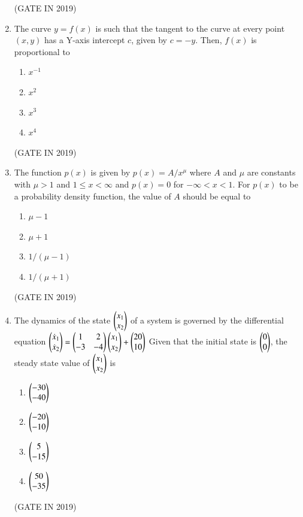 \documentclass[journal]{IEEEtran}
\begin{document}
\begin{enumerate}
\hfill(GATE IN 2019)
\item The curve $y=f(x)$ is such that the tangent to the curve at every point $(x,y)$ has a Y-axis intercept $c$, given by $c=-y$. Then, $f(x)$ is proportional to
\begin{multicols}{4}
\begin{enumerate}
\item $x^{-1}$
\item $x^2$
\item $x^3$
\item $x^4$
\end{enumerate}
\end{multicols} \hfill(GATE IN 2019)

\item The function $p(x)$ is given by $p(x)=A/x^\mu$ where $A$ and $\mu$ are constants with $\mu>1$ and $1\leq x<\infty$ and $p(x)=0$ for $-\infty<x<1$. For $p(x)$ to be a probability density function, the value of $A$ should be equal to
\begin{multicols}{2}
\begin{enumerate}
\item $\mu-1$
\item $\mu+1$
\item $1/(\mu-1)$
\item $1/(\mu+1)$
\end{enumerate}
\end{multicols} \hfill(GATE IN 2019)
\item The dynamics of the state $\begin{pmatrix} x_1 \\ x_2 \end{pmatrix}$ of a system is governed by the differential equation
$\begin{pmatrix} \dot{x}_1 \\ \dot{x}_2 \end{pmatrix} = 
\begin{pmatrix} 1 & 2 \\ -3 & -4 \end{pmatrix}
\begin{pmatrix} x_1 \\ x_2 \end{pmatrix} + 
\begin{pmatrix} 20 \\ 10 \end{pmatrix}$
Given that the initial state is $\begin{pmatrix} 0 \\ 0 \end{pmatrix}$, the steady state value of $\begin{pmatrix} x_1 \\ x_2 \end{pmatrix}$ is
\begin{multicols}{4}
\begin{enumerate}
\item $\begin{pmatrix} -30 \\ -40 \end{pmatrix}$
\item $\begin{pmatrix} -20 \\ -10 \end{pmatrix}$
\item $\begin{pmatrix} 5 \\ -15 \end{pmatrix}$
\item $\begin{pmatrix} 50 \\ -35 \end{pmatrix}$
\end{enumerate}
\end{multicols} \hfill(GATE IN 2019)


\end{enumerate}
\end{document}
